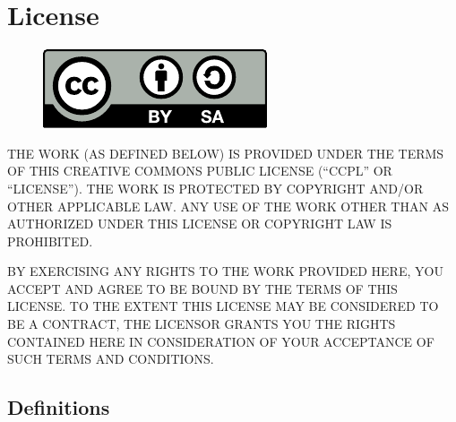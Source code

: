 
\chapter{License}
\begin{figure}[h]
\includegraphics{logos/by-sa.pdf}
\end{figure}

THE WORK (AS DEFINED BELOW) IS PROVIDED UNDER THE TERMS
OF THIS CREATIVE COMMONS PUBLIC LICENSE (``CCPL'' OR
``LICENSE''). THE WORK IS PROTECTED BY COPYRIGHT AND/OR OTHER
APPLICABLE LAW. ANY USE OF THE WORK OTHER THAN AS
AUTHORIZED UNDER THIS LICENSE OR COPYRIGHT LAW IS
PROHIBITED.

BY EXERCISING ANY RIGHTS TO THE WORK PROVIDED HERE, YOU
ACCEPT AND AGREE TO BE BOUND BY THE TERMS OF THIS LICENSE.
TO THE EXTENT THIS LICENSE MAY BE CONSIDERED TO BE A
CONTRACT, THE LICENSOR GRANTS YOU THE RIGHTS CONTAINED HERE
IN CONSIDERATION OF YOUR ACCEPTANCE OF SUCH TERMS AND
CONDITIONS.

\section{Definitions}

